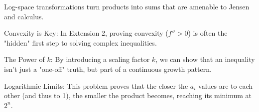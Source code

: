 \begin{takeaways}
\item Log-space transformations turn products into sums that are amenable to Jensen and calculus.
\item Convexity is Key: In Extension 2, proving convexity ($f'' > 0$) is often the "hidden" first step to solving complex inequalities.
\item The Power of $k$: By introducing a scaling factor $k$, we can show that an inequality isn't just a "one-off" truth, but part of a continuous growth pattern.
\item Logarithmic Limits: This problem proves that the closer the $a_i$ values are to each other (and thus to 1), the smaller the product becomes, reaching its minimum at $2^n$.
\end{takeaways}
